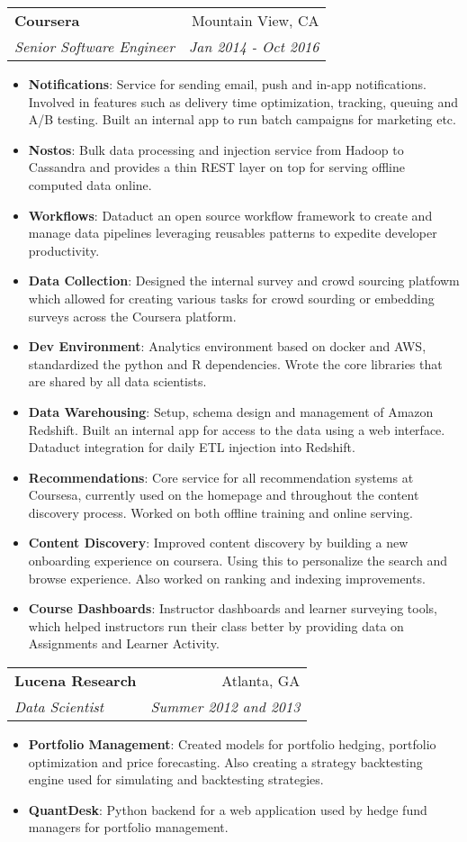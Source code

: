 \documentclass[letterpaper,11pt]{article}
\makeatletter
\newcommand{\resumeItem}[2]{
  \item\small{
    \textbf{#1}{: #2 \vspace{-2pt}}
  }
}
\newcommand{\resumeSubheading}[4]{
  \vspace{-1pt}\item
    \begin{tabular*}{0.97\textwidth}{l@{\extracolsep{\fill}}r}
      \textbf{#1} & #2 \\
      \textit{\small#3} & \textit{\small #4} \\
    \end{tabular*}\vspace{-5pt}
}
\newcommand{\resumeItemListStart}{\begin{itemize}}
\newcommand{\resumeItemListEnd}{\end{itemize}\vspace{-5pt}}
\makeatother
\begin{document}
    \resumeSubheading
      {Coursera}{Mountain View, CA}
      {Senior Software Engineer}{Jan 2014 - Oct 2016}
      \resumeItemListStart
        \resumeItem{Notifications}
          {Service for sending email, push and in-app notifications. Involved in features such as delivery time optimization, tracking, queuing and A/B testing. Built an internal app to run batch campaigns for marketing etc.}
        \resumeItem{Nostos}
          {Bulk data processing and injection service from Hadoop to Cassandra and provides a thin REST layer on top for serving offline computed data online.}
        \resumeItem{Workflows}
          {Dataduct an open source workflow framework to create and manage data pipelines leveraging reusables patterns to expedite developer productivity.}
        \resumeItem{Data Collection}
          {Designed the internal survey and crowd sourcing platfowm which allowed for creating various tasks for crowd sourding or embedding surveys across the Coursera platform.}
        \resumeItem{Dev Environment}
          {Analytics environment based on docker and AWS, standardized the python and R dependencies. Wrote the core libraries that are shared by all data scientists.}
        \resumeItem{Data Warehousing}
          {Setup, schema design and management of Amazon Redshift. Built an internal app for access to the data using a web interface. Dataduct integration for daily ETL injection into Redshift.}
        \resumeItem{Recommendations}
          {Core service for all recommendation systems at Coursesa, currently used on the homepage and throughout the content discovery process. Worked on both offline training and online serving.}
        \resumeItem{Content Discovery}
          {Improved content discovery by building a new onboarding experience on coursera. Using this to personalize the search and browse experience. Also worked on ranking and indexing improvements.}
        \resumeItem{Course Dashboards}
          {Instructor dashboards and learner surveying tools, which helped instructors run their class better by providing data on Assignments and Learner Activity.}
      \resumeItemListEnd

    \resumeSubheading
      {Lucena Research}{Atlanta, GA}
      {Data Scientist}{Summer 2012 and 2013}
      \resumeItemListStart
        \resumeItem{Portfolio Management}
          {Created models for portfolio hedging,  portfolio optimization and price forecasting. Also creating a strategy backtesting engine used for simulating and backtesting strategies.}
        \resumeItem{QuantDesk}
          {Python backend for a web application used by hedge fund managers for portfolio management.}
      \resumeItemListEnd
\end{document}
